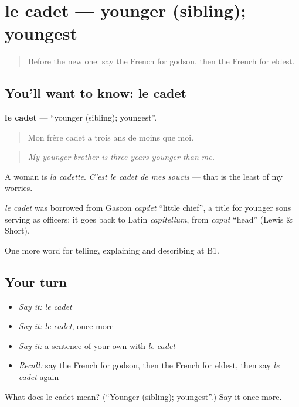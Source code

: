 \section[le cadet]{le cadet — younger (sibling); youngest}

\label{lesson:FR-C490-cadet}



\begin{quote}
Before the new one: say the French for godson, then the French for eldest.
\end{quote}

\subsection*{You'll want to know: le cadet}
\textbf{le cadet} — \textquotedblleft{}younger (sibling); youngest\textquotedblright{}.

\begin{quote}
Mon frère cadet a trois ans de moins que moi.
\end{quote}

\begin{quote}
\emph{My younger brother is three years younger than me.}
\end{quote}

A woman is \emph{la cadette}. \emph{C'est le cadet de mes soucis} — that is the least of my worries.

\begin{cousinweb}
\emph{le cadet} was borrowed from Gascon \emph{capdet} \textquotedblleft{}little chief\textquotedblright{}, a title for younger sons serving as officers; it goes back to Latin \emph{capitellum}, from \emph{caput} \textquotedblleft{}head\textquotedblright{} (Lewis \& Short).
\end{cousinweb}

\begin{grammarlens}[title={What you've built}]
One more word for telling, explaining and describing at B1.
\end{grammarlens}

\subsection*{Your turn}
\begin{itemize}
\raggedright
  \item \emph{Say it:} \emph{le cadet}
  \item \emph{Say it:} \emph{le cadet}, once more
  \item \emph{Say it:} a sentence of your own with \emph{le cadet}
  \item \emph{Recall:} say the French for godson, then the French for eldest, then say \emph{le cadet} again
\end{itemize}

\begin{tcolorbox}[breakable,colback=teal!4,colframe=teal!35!black,title={Before you move on}]
What does le cadet mean? (\textquotedblleft{}Younger (sibling); youngest\textquotedblright{}.) Say it once more.
\end{tcolorbox}
